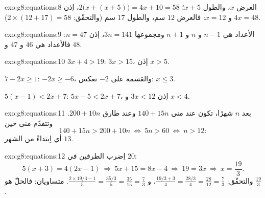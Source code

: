 \begin{solution}{exo:g8:equations:8}
العرض $x$، والطول $x + 5$؛ 
$2\bigl(x + (x + 5)\bigr) = 4x + 10 = 58$، إذن $4x = 48$ و $x = 12$:
فالعرض $12$ سم، والطول $17$ سم (والتحقّق:
$2 \times (12 + 17) = 58$).
\end{solution}

\begin{solution}{exo:g8:equations:9}
الأعداد هي $n - 1$ و $n$ و $n + 1$ ومجموعها $3n = 141$، إذن
$n = 47$: فالأعداد هي $46$ و $47$ و $48$.
\end{solution}

\begin{solution}{exo:g8:equations:10}
$3x + 4 > 19$: $3x > 15$، إذن $x > 5$.

$7 - 2x \geq 1$: $-2x \geq -6$، والقسمة على $-2$ تعكس:
$x \leq 3$.

$5(x-1) < 2x + 7$: $5x - 5 < 2x + 7$، إذن $3x < 12$ و $x < 4$.
\end{solution}

\begin{solution}{exo:g8:equations:11}
بعد $n$ شهرًا، تكون عند منى $140 + 15n$ وعند طارق $200 + 10n$. وتتقدّم منى
حين
\[
140 + 15n > 200 + 10n
\ \Longleftrightarrow\
5n > 60
\ \Longleftrightarrow\
n > 12 :
\]
أي اِبتداءً من الشهر $13$.
\end{solution}

\begin{solution}{exo:g8:equations:12}
اِضرب الطرفين في $20$:
\[
5(x + 3) = 4(2x - 1)
\ \Longrightarrow\
5x + 15 = 8x - 4
\ \Longrightarrow\
19 = 3x
\ \Longrightarrow\
x = \frac{19}{3}.
\]
والتحقّق: $\frac{19/3 + 3}{4} = \frac{28/3}{4} = \frac{28}{12} =
\frac73$، و $\frac{2 \times 19/3 - 1}{5} = \frac{35/3}{5} =
\frac{35}{15} = \frac73$. متساويان: فالحلّ هو $\frac{19}{3}$.
\end{solution}

